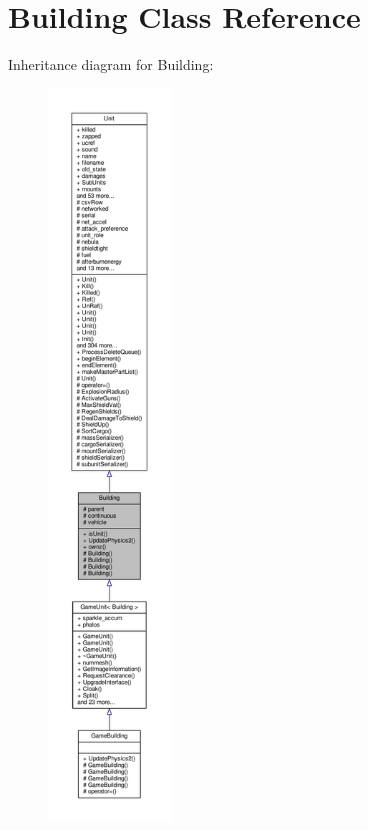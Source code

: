 \hypertarget{classBuilding}{}\section{Building Class Reference}
\label{classBuilding}


Inheritance diagram for Building\+:
\nopagebreak
\begin{figure}[H]
\begin{center}
\leavevmode
\includegraphics[height=550pt]{de/d1e/classBuilding__inherit__graph}
\end{center}
\end{figure}


